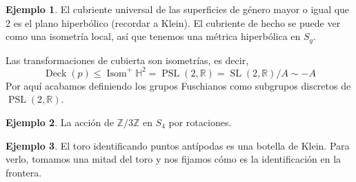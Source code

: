\documentclass[spanish]{article}
\theoremstyle{definition}
\newtheorem*{ejem}{Ejemplo}
\newcommand{\R}{\mathbb{R}}
\newcommand{\Z}{\mathbb{Z}}
\newcommand{\Hy}{\mathbb{H}}
\DeclareMathOperator{\Isom}{Isom}
\DeclareMathOperator{\Deck}{Deck}
\DeclareMathOperator{\SL}{SL}
\DeclareMathOperator{\PSL}{PSL}
\begin{document}
\begin{ejem}
	El cubriente universal de las superficies de género mayor o igual que 2 es el plano hiperbólico (recordar a Klein). El cubriente de hecho se puede ver como una isometría local, así que tenemos una métrica hiperbólica en $S_g$.
	
	Las transformaciones de cubierta son isometrías, es decir,
	\[\Deck(p)\leq \Isom^+\Hy^2=\PSL(2,\R)=\SL(2,\R)/A\sim-A\]
	Por aquí acabamos definiendo los grupos Fuschianos como subgrupos discretos de $\PSL(2,\R)$.
\end{ejem}
\begin{ejem}
	La acción de $\Z/3\Z$ en $S_4$ por rotaciones.
\end{ejem}
\begin{ejem}
	El toro identificando puntos antípodas es una botella de Klein. Para verlo, tomamos una mitad del toro y nos fijamos cómo es la identificación en la frontera.
\end{ejem}
\end{document}
